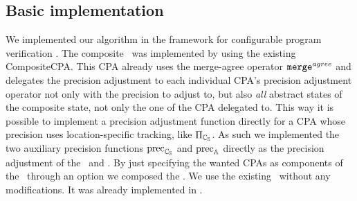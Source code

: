 \subsection{Basic implementation}
We implemented our algorithm in the framework for configurable program verification \cpaChecker \cite{Beyer2011}.
The composite \symbolicExecutionCPA\ was implemented by using the existing CompositeCPA.
This CPA already uses the merge-agree operator ${\texttt{merge}^{agree}}$ and delegates the precision adjustment to each individual CPA's precision adjustment operator not only with the precision to adjust to,
but also \emph{all} abstract states of the composite state, not only the one of the CPA delegated to.
This way it is possible to implement a precision adjustment function directly for a CPA whose precision uses location-specific tracking, like $\Pi_{\mathbb{C_{S}}}$.
As such we implemented the two auxiliary precision functions $\text{prec}_{\mathbb{C_{S}}}$ and $\text{prec}_{\mathbb{A}}$ directly as the precision adjustment of the \symbolicValueAnalysisCPA\ and \constraintsCPA.
By just specifying the wanted CPAs as components of the \compositeCPA\ through an option we composed the \symbolicExecutionCPA.
 We use the existing \locationCPA\ without any modifications. It was already implemented in \cpaChecker.


